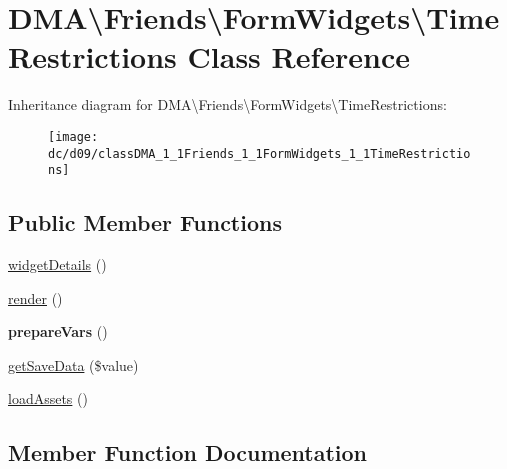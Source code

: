 \hypertarget{classDMA_1_1Friends_1_1FormWidgets_1_1TimeRestrictions}{}\section{D\+M\+A\textbackslash{}Friends\textbackslash{}Form\+Widgets\textbackslash{}Time\+Restrictions Class Reference}
\label{classDMA_1_1Friends_1_1FormWidgets_1_1TimeRestrictions}
Inheritance diagram for D\+M\+A\textbackslash{}Friends\textbackslash{}Form\+Widgets\textbackslash{}Time\+Restrictions\+:\begin{figure}[H]
\begin{center}
\leavevmode
\texttt{[image: dc/d09/classDMA\_1\_1Friends\_1\_1FormWidgets\_1\_1TimeRestrictions]}
\end{center}
\end{figure}
\subsection*{Public Member Functions}
\begin{DoxyCompactItemize}
\item 
\hyperlink{classDMA_1_1Friends_1_1FormWidgets_1_1TimeRestrictions_a74be261bb83b3287ff8ea66f1f148f89}{widget\+Details} ()
\item 
\hyperlink{classDMA_1_1Friends_1_1FormWidgets_1_1TimeRestrictions_a24e7d7ab71003ca1fbff26b8c015c66e}{render} ()
\item 
\hypertarget{classDMA_1_1Friends_1_1FormWidgets_1_1TimeRestrictions_a3a508c4fc9687a575a7e88c239c0a4f2}{}{\bfseries prepare\+Vars} ()\label{classDMA_1_1Friends_1_1FormWidgets_1_1TimeRestrictions_a3a508c4fc9687a575a7e88c239c0a4f2}

\item 
\hyperlink{classDMA_1_1Friends_1_1FormWidgets_1_1TimeRestrictions_a7b7880124cd7d2ec31b97baf75992860}{get\+Save\+Data} (\$value)
\item 
\hyperlink{classDMA_1_1Friends_1_1FormWidgets_1_1TimeRestrictions_a8cbd7604a8116dcbdaf06b1f6e754a41}{load\+Assets} ()
\end{DoxyCompactItemize}


\subsection{Member Function Documentation}
\hypertarget{classDMA_1_1Friends_1_1FormWidgets_1_1TimeRestrictions_a7b7880124cd7d2ec31b97baf75992860}{}
